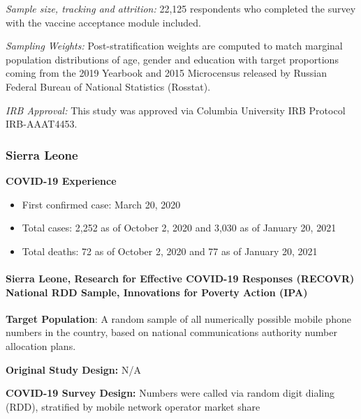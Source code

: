 \documentclass[
  12pt,
]{article}
\begin{document}
\emph{Sample size, tracking and attrition:} 22,125 respondents who completed the survey with the vaccine acceptance module included.

\emph{Sampling Weights:} Post-stratification weights are computed to match marginal population distributions of age, gender and education with target proportions coming from the 2019 Yearbook and 2015 Microcensus released by Russian Federal Bureau of National Statistics (Rosstat).

\emph{IRB Approval:} This study was approved via Columbia University IRB Protocol IRB-AAAT4453.

\hypertarget{sierra-leone}{%
\subsubsection*{Sierra Leone}\label{sierra-leone}}

\textbf{COVID-19 Experience}

\begin{itemize}
        \item First confirmed case: March 20, 2020
        \item Total cases:  2,252 as of October 2, 2020 and 3,030 as of January 20, 2021 
        \item Total deaths:  72 as of October 2, 2020 and 77 as of January 20, 2021 
\end{itemize}

\hypertarget{sierra-leone-research-for-effective-covid-19-responses-recovr-national-rdd-sample-innovations-for-poverty-action-ipa}{%
\paragraph*{Sierra Leone, Research for Effective COVID-19 Responses (RECOVR) National RDD Sample, Innovations for Poverty Action (IPA)}\label{sierra-leone-research-for-effective-covid-19-responses-recovr-national-rdd-sample-innovations-for-poverty-action-ipa}}

\textbf{Target Population}: A random sample of all numerically possible mobile phone numbers in the country, based on national communications authority number allocation plans.

\textbf{Original Study Design:} N/A

\textbf{COVID-19 Survey Design:} Numbers were called via random digit dialing (RDD), stratified by mobile network operator market share
\end{document}
